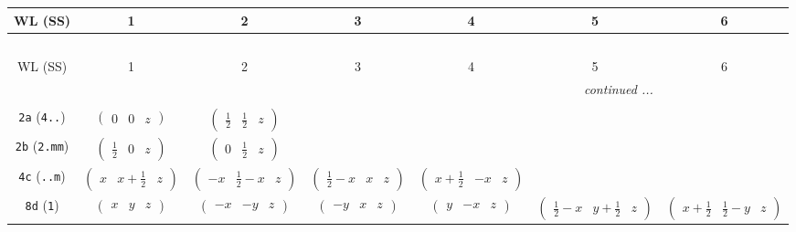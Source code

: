 \documentclass[fleqn,9pt,landscape]{jsarticle}
\begin{document}
\begin{center}
\renewcommand{\arraystretch}{1.2}
\begin{longtable}{ccccccc}
 \hline \hline
WL (SS) & 1 & 2 & 3 & 4 & 5 & 6 \\ \hline \endfirsthead

\multicolumn{6}{l}{\tablename\ \thetable{}} \\
 \hline \hline
WL (SS) & 1 & 2 & 3 & 4 & 5 & 6 \\ \hline \endhead

 \hline \hline
\multicolumn{6}{r}{\footnotesize\it continued ...} \\ \endfoot

 \hline \hline
\multicolumn{6}{r}{} \\ \endlastfoot

{\tt 2a} ({\tt 4..}) & $ \begin{pmatrix} 0 & 0 & z \end{pmatrix} $ & $ \begin{pmatrix} \frac{1}{2} & \frac{1}{2} & z \end{pmatrix} $ & $  $ & $  $ & $  $ & $  $ \\ \hline
{\tt 2b} ({\tt 2.mm}) & $ \begin{pmatrix} \frac{1}{2} & 0 & z \end{pmatrix} $ & $ \begin{pmatrix} 0 & \frac{1}{2} & z \end{pmatrix} $ & $  $ & $  $ & $  $ & $  $ \\ \hline
{\tt 4c} ({\tt ..m}) & $ \begin{pmatrix} x & x + \frac{1}{2} & z \end{pmatrix} $ & $ \begin{pmatrix} - x & \frac{1}{2} - x & z \end{pmatrix} $ & $ \begin{pmatrix} \frac{1}{2} - x & x & z \end{pmatrix} $ & $ \begin{pmatrix} x + \frac{1}{2} & - x & z \end{pmatrix} $ & $  $ & $  $ \\ \hline
{\tt 8d} ({\tt 1}) & $ \begin{pmatrix} x & y & z \end{pmatrix} $ & $ \begin{pmatrix} - x & - y & z \end{pmatrix} $ & $ \begin{pmatrix} - y & x & z \end{pmatrix} $ & $ \begin{pmatrix} y & - x & z \end{pmatrix} $ & $ \begin{pmatrix} \frac{1}{2} - x & y + \frac{1}{2} & z \end{pmatrix} $ & $ \begin{pmatrix} x + \frac{1}{2} & \frac{1}{2} - y & z \end{pmatrix} $ \\

\end{longtable}
\end{center}
\end{document}

